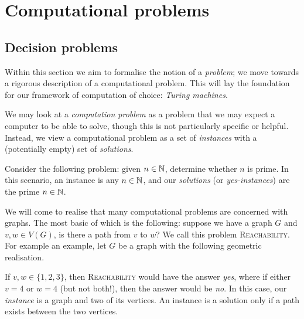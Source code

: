 \section{Computational problems}

\subsection{Decision problems}

Within this section we aim to formalise the notion of a \emph{problem}; we move towards a rigorous description of a computational problem. This will lay the foundation for our framework of computation of choice: \emph{Turing machines}. 

We may look at a \emph{computation problem} as a problem that we may expect a computer to be able to solve, though this is not particularly specific or helpful. Instead, we view a computational problem as a set of \emph{instances} with a (potentially empty) set of \emph{solutions}.

\begin{example}
  Consider the following problem: given $n \in \mathbb N$, determine whether $n$ is prime. In this scenario, an instance is any $n \in \mathbb N$, and our \emph{solutions} (or \emph{yes-instances}) are the prime $n \in \mathbb N$. 
\end{example}

\begin{example}
  We will come to realise that many computational problems are concerned with graphs. The most basic of which is the following: suppose we have a graph $G$ and $v, w \in V(G)$, is there a path from $v$ to $w$? We call this problem \textsc{Reachability}. For example an example, let $G$ be a graph with the following geometric realisation. 
  \begin{center}
  \end{center}
  If $v, w \in \{1,2,3\}$, then \textsc{Reachability} would have the answer \emph{yes}, where if either $v = 4$ or $w = 4$ (but not both!), then the answer would be \emph{no}. In this case, our \emph{instance} is a graph and two of its vertices. An instance is a solution only if a path exists between the two vertices.
\end{example}

